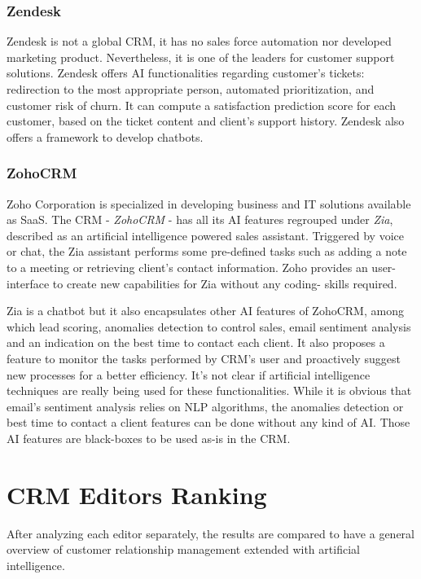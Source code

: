 \subsubsection*{Zendesk}
Zendesk is not a global CRM, it has no sales force automation nor developed marketing product. Nevertheless, it is one of the leaders for customer support solutions. Zendesk offers AI functionalities regarding customer's tickets: redirection to the most appropriate person, automated prioritization, and customer risk of churn. It can compute a satisfaction prediction score for each customer, based on the ticket content and client's support history. Zendesk also offers a framework to develop chatbots.

\subsubsection*{ZohoCRM}
Zoho Corporation is specialized in developing business and IT solutions available as SaaS. The CRM - \textit{ZohoCRM} - has all its AI features regrouped under \textit{Zia}, described as an artificial intelligence powered sales assistant. Triggered by voice or chat, the Zia assistant performs some pre-defined tasks such as adding a note to a meeting or retrieving client's contact information. Zoho provides an user-interface to create new capabilities for Zia without any coding- skills required.

Zia is a chatbot but it also encapsulates other AI features of ZohoCRM, among which lead scoring, anomalies detection to control sales, email sentiment analysis and an indication on the best time to contact each client. It also proposes a feature to monitor the tasks performed by CRM's user and proactively suggest new processes for a better efficiency. It's not clear if artificial intelligence techniques are really being used for these functionalities. While it is obvious that email's sentiment analysis relies on NLP algorithms, the anomalies detection or best time to contact a client features can be done without any kind of AI. Those AI features are black-boxes to be used as-is in the CRM.


\section{CRM Editors Ranking}
After analyzing each editor separately, the results are compared to have a general overview of customer relationship management extended with artificial intelligence.

